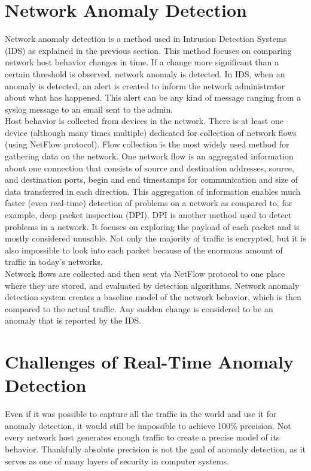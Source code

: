 \documentclass[thesis=B,english]{FITthesis}[2012/10/20]
\begin{document}
\section{Network Anomaly Detection}\label{sec:nbad}
Network anomaly detection is a method used in Intrusion Detection Systems (IDS) as explained in the previous section.
This method focuses on comparing network host behavior changes in time.
If a change more significant than a certain threshold is observed, network anomaly is detected.
In IDS, when an anomaly is detected, an alert is created to inform the network administrator about what has happened.
This alert can be any kind of message ranging from a syslog message to an email sent to the admin. \\

Host behavior is collected from devices in the network.
There is at least one device (although many times multiple) dedicated for collection of network flows (using NetFlow protocol).
Flow collection is the most widely used method for gathering data on the network.
One network flow is an aggregated information about one connection that consists of source and destination addresses, source, and destination ports, begin and end timestamps for communication and size of data transferred in each direction.
This aggregation of information enables much faster (even real-time) detection of problems on a network as compared to, for example, deep packet inspection (DPI).
DPI is another method used to detect problems in a network.
It focuses on exploring the payload of each packet and is mostly considered unusable.
Not only the majority of traffic is encrypted, but it is also impossible to look into each packet because of the enormous amount of traffic in today's networks. \\

Network flows are collected and then sent via NetFlow protocol to one place where they are stored, and evaluated by detection algorithms.
Network anomaly detection system creates a baseline model of the network behavior, which is then compared to the actual traffic.
Any sudden change is considered to be an anomaly that is reported by the IDS. \\

\section{Challenges of Real-Time Anomaly Detection}\label{sec:challenges}
Even if it was possible to capture all the traffic in the world and use it for anomaly detection, it would still be impossible to achieve 100\% precision.
Not every network host generates enough traffic to create a precise model of its behavior.
Thankfully absolute precision is not the goal of anomaly detection, as it serves as one of many layers of security in computer systems. \\
\end{document}
